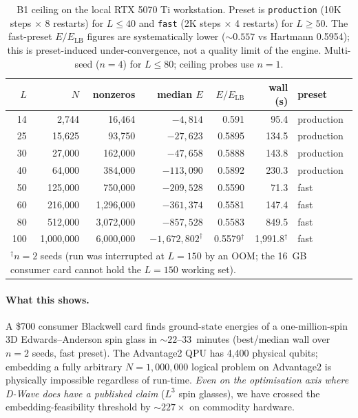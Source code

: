 \documentclass[11pt,a4paper]{article}
\begin{document}
\begin{table}[h]
\centering
\caption{B1 ceiling on the local RTX 5070 Ti workstation. Preset is
\texttt{production} (10K steps $\times$ 8 restarts) for $L\!\le\!40$ and
\texttt{fast} (2K steps $\times$ 4 restarts) for $L\!\ge\!50$. The
fast-preset $E/E_{\mathrm{LB}}$ figures are systematically lower
($\sim 0.557$ vs Hartmann 0.5954); this is preset-induced
under-convergence, not a quality limit of the engine. Multi-seed
($n\!=\!4$) for $L\!\le\!80$; ceiling probes use $n\!=\!1$.}
\label{tab:ceiling_local}
\small
\begin{tabular}{rrrrrrl}
\toprule
$L$ & $N$ & nonzeros & median $E$ & $E/E_{\mathrm{LB}}$ & wall (s) & preset \\
\midrule
14 & 2{,}744 & 16{,}464 & $-4{,}814$ & 0.591 & 95.4 & production \\
25 & 15{,}625 & 93{,}750 & $-27{,}623$ & 0.5895 & 134.5 & production \\
30 & 27{,}000 & 162{,}000 & $-47{,}658$ & 0.5888 & 143.8 & production \\
40 & 64{,}000 & 384{,}000 & $-113{,}090$ & 0.5892 & 230.3 & production \\
50 & 125{,}000 & 750{,}000 & $-209{,}528$ & 0.5590 & 71.3 & fast \\
60 & 216{,}000 & 1{,}296{,}000 & $-361{,}374$ & 0.5581 & 147.4 & fast \\
80 & 512{,}000 & 3{,}072{,}000 & $-857{,}528$ & 0.5583 & 849.5 & fast \\
100 & 1{,}000{,}000 & 6{,}000{,}000 & $-1{,}672{,}802^\dagger$ & 0.5579$^\dagger$ & 1{,}991.8$^\dagger$ & fast \\
\bottomrule
\multicolumn{7}{l}{\footnotesize $^\dagger$$n\!=\!2$ seeds (run was interrupted at $L\!=\!150$ by an OOM; the 16~GB consumer card cannot hold the $L\!=\!150$ working set).}
\end{tabular}
\end{table}

\paragraph{What this shows.} A \$700 consumer Blackwell card finds
ground-state energies of a one-million-spin 3D Edwards--Anderson spin
glass in $\sim\!22$--$33$~minutes (best/median wall over $n\!=\!2$ seeds,
fast preset). The Advantage2 QPU has 4{,}400 physical qubits;
embedding a fully arbitrary $N\!=\!1{,}000{,}000$ logical problem on
Advantage2 is physically impossible regardless of run-time. \emph{Even
on the optimisation axis where D-Wave does have a published claim} ($L^3$
spin glasses), we have crossed the embedding-feasibility threshold by
$\sim 227\times$ on commodity hardware.
\end{document}
